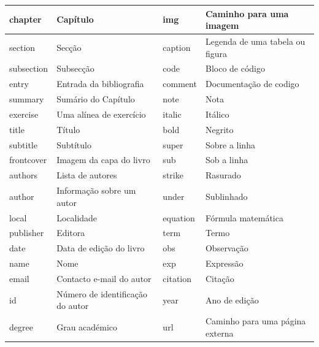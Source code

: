\documentclass[a4paper]{article}
\begin{document}
\begin{center}
\begin{tabular}[c]{|l|l|l|l|}
\hline
\normalsize chapter & \normalsize Capítulo & \normalsize img & \normalsize Caminho para uma imagem\\
\hline
\normalsize section & \normalsize Secção & \normalsize caption & \normalsize Legenda de uma tabela ou figura\\
\hline
\normalsize subsection & \normalsize Subsecção & \normalsize code & \normalsize Bloco de código\\
\hline
\normalsize entry & \normalsize Entrada da bibliografia & \normalsize comment & \normalsize Documentação de codigo\\
\hline
\normalsize summary & \normalsize Sumário do Capítulo & \normalsize note & \normalsize Nota\\
\hline 
\normalsize exercise & \normalsize Uma alínea de exercício & \normalsize italic & \normalsize Itálico\\
\hline
\normalsize title & \normalsize Título & \normalsize bold & \normalsize Negrito\\
\hline
\normalsize subtitle & \normalsize Subtítulo & \normalsize super & \normalsize Sobre a linha\\
\hline
\normalsize frontcover & \normalsize Imagem da capa do livro & \normalsize sub & \normalsize Sob a linha\\
\hline
\normalsize authors & \normalsize Lista de autores & \normalsize strike & \normalsize Rasurado\\
\hline 
\normalsize author & \normalsize Informação sobre um autor & \normalsize under & \normalsize Sublinhado\\
\hline
\normalsize local & \normalsize Localidade & \normalsize equation & \normalsize Fórmula matemática\\
\hline
\normalsize publisher & \normalsize Editora & \normalsize term & \normalsize Termo\\
\hline
\normalsize date & \normalsize Data de edição do livro & \normalsize obs & \normalsize Observação\\
\hline
\normalsize name & \normalsize Nome & \normalsize exp & \normalsize Expressão\\
\hline            
\normalsize email & \normalsize Contacto e-mail do autor & \normalsize citation & \normalsize Citação\\
\hline
\normalsize id & \normalsize Número de identificação do autor & \normalsize year & \normalsize Ano de edição\\
\hline
\normalsize degree & \normalsize Grau académico & \normalsize url & \normalsize Caminho para uma página externa\\

\end{tabular}
\end{center}
\end{document}
